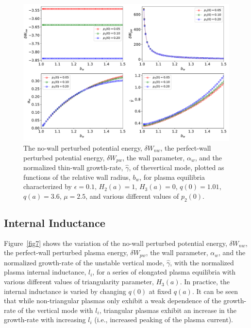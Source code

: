 \documentclass[12pt,prb,aps]{revtex4-1}
\begin{document}
\begin{figure}
\centerline{\includegraphics[width=\textwidth]{Fig6.pdf}}
\caption{The no-wall perturbed potential energy, $\delta W_{nw}$, the perfect-wall perturbed potential energy, $\delta W_{pw}$, the wall
parameter, $\alpha_w$, and the normalized thin-wall growth-rate, $\hat{\gamma}$,  of thevertical mode, plotted as  functions of the
relative wall radius, $b_w$, for plasma equilibria characterized by  $\epsilon=0.1$, $H_2(a)=1$, $H_3(a)=0$, $q(0)=1.01$, $q(a)=3.6$, $\mu=2.5$, and various different values of $p_2(0)$.\label{fig6}}
\end{figure}

\subsection{Internal Inductance}
Figure~\ref{fig7} shows the variation of the no-wall perturbed potential energy, $\delta W_{nw}$, the perfect-wall perturbed plasma energy, $\delta W_{pw}$, the wall 
parameter, $\alpha_w$, and the normalized growth-rate of the unstable vertical mode, $\hat{\gamma}$, with the normalized plasma internal inductance, $l_i$,   for a series of
elongated plasma equilibria with various different values of triangularity parameter, $H_3(a)$. In practice, the internal inductance is varied by changing $q(0)$ at
fixed $q(a)$. It can be seen that while non-triangular plasmas only exhibit a weak dependence of the growth-rate of the vertical mode with $l_i$, triangular
plasmas exhibit an increase in the growth-rate with increasing $l_i$ (i.e., increased peaking of the plasma current). 
\end{document}
